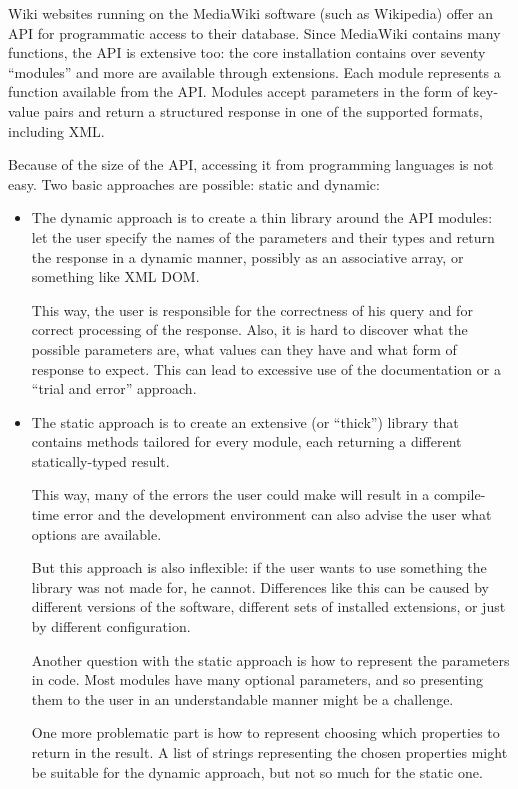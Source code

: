 
Wiki websites running on the MediaWiki software (such as Wikipedia) offer an \ac{API}
for programmatic access to their database.
Since MediaWiki contains many functions, the \acs{API} is extensive too:
the core installation contains over seventy “modules” and more are available through extensions.
Each module represents a function available from the \acs{API}.
Modules accept parameters in the form of key-value pairs
and return a structured response in one of the supported formats, including \acs{XML}.

Because of the size of the API, accessing it from programming languages is not easy.
Two basic approaches are possible: static and dynamic:

\begin{itemize}
\item The dynamic approach is to create a thin library around the API modules:
let the user specify the names of the parameters and their types and return the response
in a dynamic manner, possibly as an associative array, or something like \acs{XML} \ac{DOM}.

This way, the user is responsible for the correctness of his query and for correct processing
of the response.
Also, it is hard to discover what the possible parameters are, what values can they have
and what form of response to expect.
This can lead to excessive use of the documentation or a “trial and error” approach.

\item The static approach is to create an extensive (or “thick”) library that contains methods tailored for every module,
each returning a different statically-typed result.

This way, many of the errors the user could make will result in a compile-time error
and the development environment can also advise the user what options are available.

But this approach is also inflexible: if the user wants to use something the library
was not made for, he cannot.
Differences like this can be caused by different versions of the software,
different sets of installed extensions, or just by different configuration.

Another question with the static approach is how to represent the parameters in code.
Most modules have many optional parameters, and so presenting them to the user
in an understandable manner might be a challenge.

One more problematic part is how to represent choosing which properties to return in the result.
A list of strings representing the chosen properties might be suitable for the dynamic approach, but not so much for the static one.
\end{itemize}

